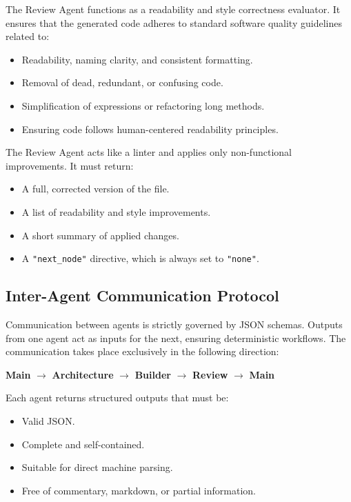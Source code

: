 \documentclass[12pt,a4paper]{article}
\begin{document}
The Review Agent functions as a readability and style correctness evaluator. It ensures that the generated code adheres to standard software quality guidelines related to:

\begin{itemize}
    \item Readability, naming clarity, and consistent formatting.
    \item Removal of dead, redundant, or confusing code.
    \item Simplification of expressions or refactoring long methods.
    \item Ensuring code follows human-centered readability principles.
\end{itemize}

The Review Agent acts like a linter and applies only non-functional improvements. It must return:

\begin{itemize}
    \item A full, corrected version of the file.
    \item A list of readability and style improvements.
    \item A short summary of applied changes.
    \item A \texttt{"next\_node"} directive, which is always set to \texttt{"none"}.
\end{itemize}

\subsection{Inter-Agent Communication Protocol}

Communication between agents is strictly governed by JSON schemas. Outputs from one agent act as inputs for the next, ensuring deterministic workflows. The communication takes place exclusively in the following direction:

\begin{center}
\textbf{Main} $\rightarrow$ \textbf{Architecture} $\rightarrow$ \textbf{Builder} $\rightarrow$ \textbf{Review} $\rightarrow$ \textbf{Main}
\end{center}

Each agent returns structured outputs that must be:

\begin{itemize}
    \item Valid JSON.
    \item Complete and self-contained.
    \item Suitable for direct machine parsing.
    \item Free of commentary, markdown, or partial information.
\end{itemize}
\end{document}
